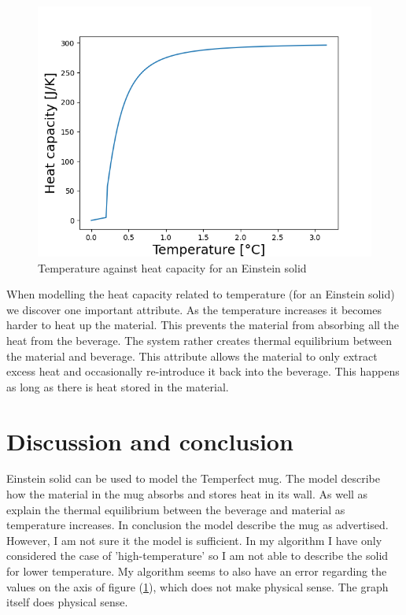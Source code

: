 \documentclass[reprint,english,notitlepage]{revtex4-2}
\begin{document}
\begin{figure}[h]
  \includegraphics[scale=0.5]{T_mot_cv.png}
  \caption{Temperature against heat capacity for an Einstein solid}\label{fig: tagainstcv}
\end{figure}
When modelling the heat capacity related to temperature (for an Einstein solid) we discover one important attribute. As the temperature increases it becomes harder to heat up the material. This prevents the material from absorbing all the heat from the beverage. The system rather creates thermal equilibrium between the material and beverage. This attribute allows the material to only extract excess heat and occasionally re-introduce it back into the beverage. This happens as long as there is heat stored in the material.

\section{Discussion and conclusion}
Einstein solid can be used to model the Temperfect mug. The model describe how the material in the mug absorbs and stores heat in its wall. As well as explain the thermal equilibrium between the beverage and material as temperature increases. In conclusion the model describe the mug as advertised.
However, I am not sure it the model is sufficient. In my algorithm I have only considered the case of 'high-temperature' so I am not able to describe the solid for lower temperature. My algorithm seems to also have an error regarding the values on the axis of figure (\ref{fig: tagainstcv}), which does not make physical sense. The graph itself does physical sense.
\end{document}
